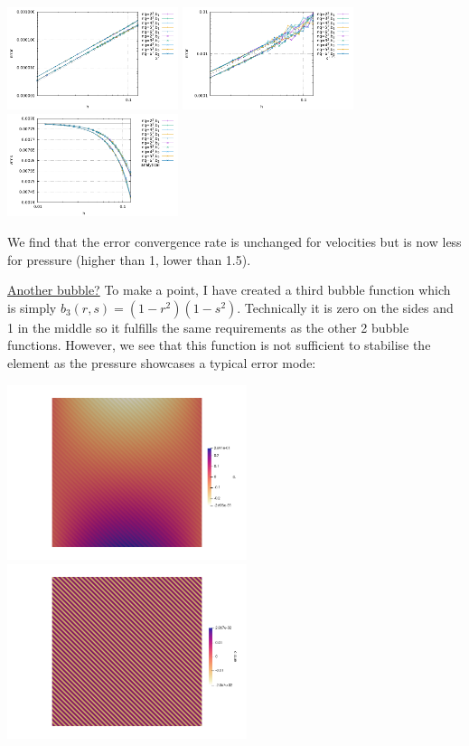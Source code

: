\begin{center}
\includegraphics[width=5cm]{python_codes/fieldstone_72/results/mms/errors_v_rand}
\includegraphics[width=5cm]{python_codes/fieldstone_72/results/mms/errors_p_rand}
\includegraphics[width=5cm]{python_codes/fieldstone_72/results/mms/vrms_rand}
\end{center}

We find that the error convergence rate is unchanged for velocities but is now less 
for pressure (higher than 1, lower than 1.5). 

\vspace{.5cm}
\underline{Another bubble?} 
To make a point, I have created a third bubble function which is simply $b_3(r,s)=(1-r^2)(1-s^2)$.
Technically it is zero on the sides and 1 in the middle so it fulfills the 
same requirements as the other 2 bubble functions. 
However, we see that this function is not sufficient to stabilise the element as the pressure 
showcases a typical error mode:
\begin{center}
\includegraphics[width=7cm]{python_codes/fieldstone_72/results/mms/p_b3}
\includegraphics[width=7cm]{python_codes/fieldstone_72/results/mms/p_error_b3}
\end{center}

